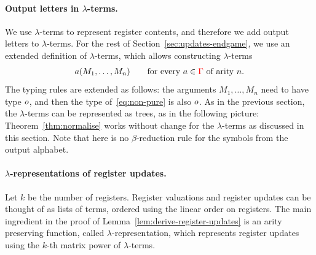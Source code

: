 \paragraph*{Output letters in $\lambda$-terms.} We  use $\lambda$-terms to represent register contents, and therefore we add output letters to $\lambda$-terms. For the rest of Section~\ref{sec:updates-endgame}, we use an extended definition of $\lambda$-terms, which allows  constructing $\lambda$-terms
\begin{align}\label{eq:non-pure}
a(M_1,\ldots,M_n) \qquad \text{for every $a \in {\color{red}{\Gamma}}$ of arity $n$.}
\end{align}
The typing rules are extended as follows: the arguments $M_1,\ldots,M_n$ need to have type $o$, and then the  type of~\eqref{eq:non-pure} is also $o$. As in the previous section, the $\lambda$-terms can be represented as trees, as in the following picture:
Theorem~\ref{thm:normalise} works without change for the  $\lambda$-terms as discussed in this section. Note that here is no $\beta$-reduction rule for the symbols from the output alphabet. 


\paragraph*{$\lambda$-representations of register updates.} Let $k$ be the number of registers. Register valuations and register updates can be thought of as lists of terms, ordered using the linear order on registers. The main ingredient in the proof of Lemma~\ref{lem:derive-register-updates} is an arity preserving function, called \emph{$\lambda\text{-representation}$}, which represents register updates using the $k$-th matrix power of $\lambda$-terms. 

